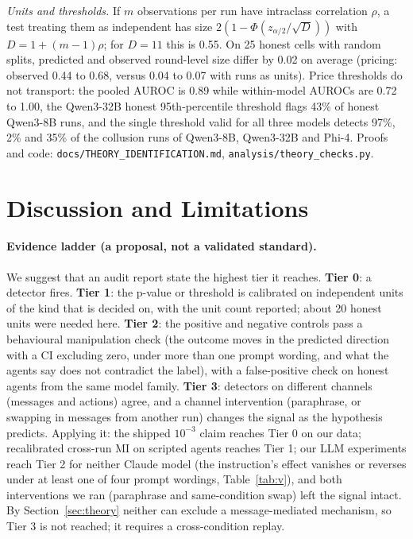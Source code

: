 \documentclass[10pt]{article}
\begin{document}
\emph{Units and thresholds.} If $m$ observations per run have intraclass correlation $\rho$, a test treating them as independent has size $2(1-\Phi(z_{\alpha/2}/\sqrt{D}))$ with $D=1+(m-1)\rho$; for $D=11$ this is 0.55. On 25 honest cells with random splits, predicted and observed round-level size differ by 0.02 on average (pricing: observed 0.44 to 0.68, versus 0.04 to 0.07 with runs as units). Price thresholds do not transport: the pooled AUROC is 0.89 while within-model AUROCs are 0.72 to 1.00, the Qwen3-32B honest 95th-percentile threshold flags 43\% of honest Qwen3-8B runs, and the single threshold valid for all three models detects 97\%, 2\% and 35\% of the collusion runs of Qwen3-8B, Qwen3-32B and Phi-4. Proofs and code: \texttt{docs/THEORY\_IDENTIFICATION.md}, \texttt{analysis/theory\_checks.py}.

\section{Discussion and Limitations}\label{sec:disc}
\paragraph{Evidence ladder (a proposal, not a validated standard).} We suggest that an audit report state the highest tier it reaches. \textbf{Tier 0}: a detector fires. \textbf{Tier 1}: the p-value or threshold is calibrated on independent units of the kind that is decided on, with the unit count reported; about 20 honest units were needed here. \textbf{Tier 2}: the positive and negative controls pass a behavioural manipulation check (the outcome moves in the predicted direction with a CI excluding zero, under more than one prompt wording, and what the agents say does not contradict the label), with a false-positive check on honest agents from the same model family. \textbf{Tier 3}: detectors on different channels (messages and actions) agree, and a channel intervention (paraphrase, or swapping in messages from another run) changes the signal as the hypothesis predicts. Applying it: the shipped $10^{-3}$ claim reaches Tier 0 on our data; recalibrated cross-run MI on scripted agents reaches Tier 1; our LLM experiments reach Tier 2 for neither Claude model (the instruction's effect vanishes or reverses under at least one of four prompt wordings, Table~\ref{tab:v}), and both interventions we ran (paraphrase and same-condition swap) left the signal intact. By Section~\ref{sec:theory} neither can exclude a message-mediated mechanism, so Tier 3 is not reached; it requires a cross-condition replay.
\end{document}
